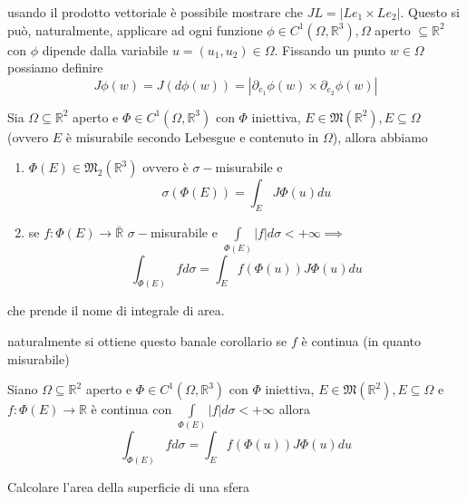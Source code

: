 usando il prodotto vettoriale è possibile mostrare che $JL = |Le_1 \times Le_2|$. Questo si può, naturalmente, applicare ad ogni funzione $\phi \in C^1(\Omega, \mathbb{R}^3), \Omega$ aperto $\subseteq \mathbb{R}^2$ con $\phi$ dipende dalla variabile $u = (u_1, u_2) \in \Omega$. Fissando un punto $w \in \Omega$ possiamo definire
$$
J\phi(w) = J(d\phi(w)) = |\partial_{e_1} \phi(w) \times \partial_{e_2} \phi(w)|
$$
\begin{theorem}[teorema H2]
	Sia $\Omega \subseteq \mathbb{R}^2$ aperto e $\Phi \in C^1(\Omega, \mathbb{R}^3)$ con $\Phi$ iniettiva, $E \in \mathfrak{M}(\mathbb{R}^2), E \subseteq \Omega$ (ovvero $E$ è misurabile secondo Lebesgue e contenuto in $\Omega$), allora abbiamo
	\begin{enumerate}[label=\protect\circled{\arabic*}]
		\item $\Phi(E) \in \mathfrak{M}_2(\mathbb{R}^3)$ ovvero è $\sigma-$misurabile e 
		$$
		\sigma(\Phi(E)) = \int_E J\Phi(u)du
		$$
		\item se $f: \Phi(E) \to \bar{\mathbb{R}}$ $\sigma-$misurabile e $\int\limits_{\Phi(E)} |f|d\sigma < +\infty \implies$
		$$
			\int_{\Phi(E)} fd\sigma = \int_E f(\Phi(u))J\Phi(u)du
		$$
	\end{enumerate}
	che prende il nome di integrale di area.
\end{theorem}
naturalmente si ottiene questo banale corollario se $f$ è continua (in quanto misurabile)
\begin{cor}
	Siano $\Omega \subseteq \mathbb{R}^2$ aperto e $\Phi \in C^1(\Omega, \mathbb{R}^3)$ con $\Phi$ iniettiva, $E \in \mathfrak{M}(\mathbb{R}^2), E \subseteq \Omega$ e $f: \Phi(E) \to \mathbb{R}$ è continua con
	$\int\limits_{\Phi(E)} |f|d\sigma < +\infty$ allora
	$$
	\int_{\Phi(E)} f d\sigma = \int_E f(\Phi(u)) J\Phi(u)du
	$$
\end{cor}
\begin{example}
	Calcolare l'area della superficie di una sfera
\end{example}
